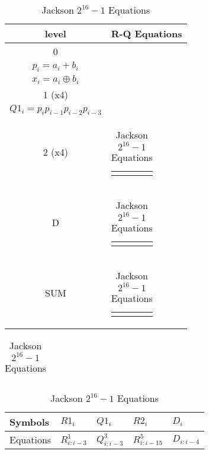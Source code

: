 \begin{table}[H]
\centering
     \begin{tabularx}{\textwidth}{|| c | X ||}
     
        \hline
        level & R-Q Equations\\
        \hline
        \hline
        0   & 
        \begin{tabular}{@{}c@{}}
        $g_i = a_i * b_i$\\
        $p_i = a_i + b_i$\\
        $x_i = a_i \oplus b_i $
        \end{tabular}\\\hline
        

        1 (x4)  & 
        \begin{tabular}{@{}c@{}}
        $R1_i = g_i + g_{i-1} + p_{i-1}g_{i-2} + p_{i-1}p_{i-2}g_{i-3}$\\
        $Q1_i = p_ip_{i-1}p_{i-2}p_{i-3}$
        \end{tabular}\\\hline
       

        2 (x4)  & 
        \begin{tabular}{@{}c@{}}
        $R2_i = R1_i + R1_{i-4} + Q1_{i-5}*R1_{i-8} + Q1_{i-5}*Q1_{i-9}*R1_{i-12}$
        \end{tabular}\\\hline
        

        D   & 
        \begin{tabular}{@{}c@{}}$ D_i = p_iR1_i + p_{i-1}Q1_i$
        \end{tabular}\\\hline
        

        SUM   & 
        \begin{tabular}{@{}c@{}}$ sum_i = R2_{i-1}\ ?\ (x_i \oplus D_{i-1})\ :\ x_i$
        \end{tabular}\\\hline
        
    \end{tabularx}
    
    
    \begin{tabularx}{\textwidth}{X} 
    \\
    \end{tabularx}  
    
    
    \begin{tabularx}{\textwidth}{| X | X X X X | } 
        \hline
        Symbols & $R1_i$ & $Q1_i$ & $R2_i$ & $D_i$ \\
        \hline
        Equations & $R^1_{i:i-3}$ & $Q^3_{i:i-3}$ & $R^5_{i:i-15}$ &$ D_{i:i-4}$ \\
        \hline
    \end{tabularx}
    
\caption{Jackson $2^{16}-1$ Equations}
\end{table}

